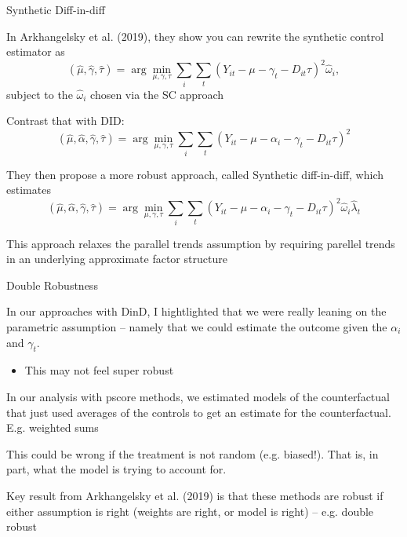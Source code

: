 \documentclass[notes,11pt, aspectratio=169]{beamer}
\newenvironment{wideitemize}{\itemize\addtolength{\itemsep}{10pt}}{\enditemize}
\begin{document}
\begin{frame}{Synthetic Diff-in-diff}
  \begin{wideitemize}
  \item In Arkhangelsky et al. (2019), they show you can rewrite the synthetic control estimator as 
    \begin{equation*}
      (\hat{\mu}, \hat{\gamma}, \hat{\tau}) = \arg\min_{\mu, \gamma, \tau}\sum_{i}\sum_{t}(Y_{it} - \mu - \gamma_{t} - D_{it}\tau)^{2}\hat{\omega}_{i},
    \end{equation*}
    subject to the $\hat{\omega}_{i}$ chosen via the SC approach
  \item Contrast that with DID:
    \begin{equation*}
      (\hat{\mu},\hat{\alpha}, \hat{\gamma}, \hat{\tau}) = \arg\min_{\mu, \gamma, \tau}\sum_{i}\sum_{t}(Y_{it} - \mu -\alpha_{i} - \gamma_{t} - D_{it}\tau)^{2}
    \end{equation*}
  \item They then propose a more robust approach, called Synthetic diff-in-diff, which estimates
    \begin{equation*}
      (\hat{\mu},\hat{\alpha}, \hat{\gamma}, \hat{\tau}) = \arg\min_{\mu, \gamma, \tau}\sum_{i}\sum_{t}(Y_{it} - \mu -\alpha_{i} - \gamma_{t} - D_{it}\tau)^{2}\hat{\omega}_{i}\hat{\lambda}_{t}
    \end{equation*}
  \item This approach relaxes the parallel trends assumption by requiring parellel trends in an underlying approximate factor structure
  \end{wideitemize}
\end{frame}

\begin{frame}{Double Robustness}
  \begin{wideitemize}
  \item   In our approaches with DinD, I hightlighted that we were really
  leaning on the parametric assumption -- namely that we could
  estimate the outcome given the $\alpha_{i}$ and $\gamma_{t}$.
  \begin{itemize}
  \item   This may not feel super robust
  \end{itemize}
\item   In our analysis with pscore methods, we estimated models of the
  counterfactual that just used averages of the controls to get an
  estimate for the counterfactual. E.g. weighted sums
\item   This could be wrong if the treatment is not random
  (e.g. biased!). That is, in part, what the model is trying to
  account for.
\item Key result from Arkhangelsky et al. (2019) is that these methods
  are robust if either assumption is right (weights are right, or
  model is right) -- e.g. double robust
  \end{wideitemize}
\end{frame}
\end{document}
